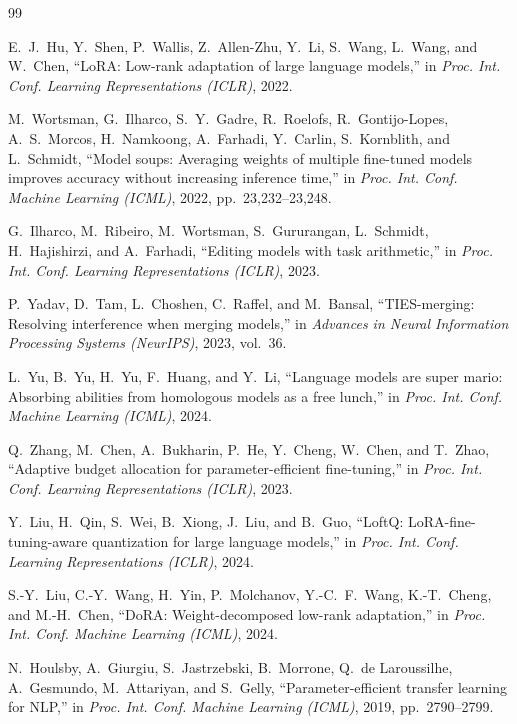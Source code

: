 \documentclass[preprint,12pt]{elsarticle}
\begin{document}
\begin{thebibliography}{99}

E.~J.~Hu, Y.~Shen, P.~Wallis, Z.~Allen-Zhu, Y.~Li, S.~Wang, L.~Wang, and
W.~Chen, ``LoRA: Low-rank adaptation of large language models,'' in
\textit{Proc. Int. Conf. Learning Representations (ICLR)}, 2022.

M.~Wortsman, G.~Ilharco, S.~Y.~Gadre, R.~Roelofs, R.~Gontijo-Lopes,
A.~S.~Morcos, H.~Namkoong, A.~Farhadi, Y.~Carlin, S.~Kornblith, and
L.~Schmidt, ``Model soups: Averaging weights of multiple fine-tuned models
improves accuracy without increasing inference time,'' in
\textit{Proc. Int. Conf. Machine Learning (ICML)}, 2022, pp.~23,232--23,248.

G.~Ilharco, M.~Ribeiro, M.~Wortsman, S.~Gururangan, L.~Schmidt, H.~Hajishirzi,
and A.~Farhadi, ``Editing models with task arithmetic,'' in
\textit{Proc. Int. Conf. Learning Representations (ICLR)}, 2023.

P.~Yadav, D.~Tam, L.~Choshen, C.~Raffel, and M.~Bansal,
``TIES-merging: Resolving interference when merging models,'' in
\textit{Advances in Neural Information Processing Systems (NeurIPS)}, 2023,
vol.~36.

L.~Yu, B.~Yu, H.~Yu, F.~Huang, and Y.~Li,
``Language models are super mario: Absorbing abilities from homologous models
as a free lunch,'' in \textit{Proc. Int. Conf. Machine Learning (ICML)}, 2024.

Q.~Zhang, M.~Chen, A.~Bukharin, P.~He, Y.~Cheng, W.~Chen, and T.~Zhao,
``Adaptive budget allocation for parameter-efficient fine-tuning,'' in
\textit{Proc. Int. Conf. Learning Representations (ICLR)}, 2023.

Y.~Liu, H.~Qin, S.~Wei, B.~Xiong, J.~Liu, and B.~Guo,
``LoftQ: LoRA-fine-tuning-aware quantization for large language models,'' in
\textit{Proc. Int. Conf. Learning Representations (ICLR)}, 2024.

S.-Y.~Liu, C.-Y.~Wang, H.~Yin, P.~Molchanov, Y.-C.~F.~Wang, K.-T.~Cheng,
and M.-H.~Chen, ``DoRA: Weight-decomposed low-rank adaptation,'' in
\textit{Proc. Int. Conf. Machine Learning (ICML)}, 2024.

N.~Houlsby, A.~Giurgiu, S.~Jastrzebski, B.~Morrone, Q.~de Laroussilhe,
A.~Gesmundo, M.~Attariyan, and S.~Gelly, ``Parameter-efficient transfer
learning for NLP,'' in \textit{Proc. Int. Conf. Machine Learning (ICML)},
2019, pp.~2790--2799.


\end{thebibliography}
\end{document}
